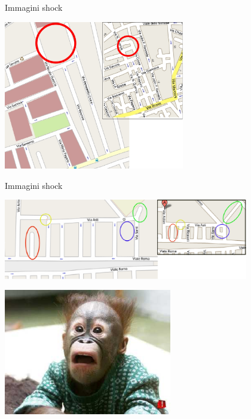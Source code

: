 \documentclass[slidestop,compress,red,notes,xcolor=dvipsnames]{beamer}	%
\begin{document}
        \begin{frame}{Immagini shock}
            \begin{center}
                \includegraphics[height=6.5cm]{images/mappe/croce.eps}
            \end{center}
        \end{frame}

        \begin{frame}{Immagini shock}
            \vspace{1cm}
            \begin{center}
                \includegraphics[height=3.5cm]{images/mappe/acton.eps}
            \end{center}
        \end{frame}

        \begin{frame}
        \vspace{1cm}
            \begin{center}
                \includegraphics[height=5.5cm]{images/mappe/monkey.eps}
            \end{center}
        \end{frame}
\end{document}
